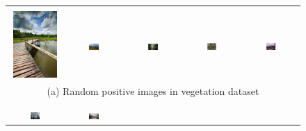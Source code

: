 \begin{figure}[th]
{{\begin{center}
\begin{tabular}{@{}c@{\,\,\,}c@{\,\,\,}c@{\,\,\,}c@{\,\,\,}c@{\,\,\,}}
\\[-6pt]
\hline
\\[-6pt]
\includegraphics[height=1in]{imggrid/datasetposi/6.jpg} &
\includegraphics[width=0.19\textwidth]{imggrid/datasetposi/7.jpg} &
\includegraphics[width=0.19\textwidth]{imggrid/datasetposi/8.jpg} &
\includegraphics[width=0.19\textwidth]{imggrid/datasetposi/9.jpg} &
\includegraphics[width=0.19\textwidth]{imggrid/datasetposi/10.jpg} \\
\multicolumn{5}{c}{(a) Random positive images in vegetation dataset} \\ 
\\[-6pt]
\hline
\\[-6pt]
\includegraphics[width=0.19\textwidth]{imggrid/datasetnega/1.jpg} &
\includegraphics[width=0.19\textwidth]{imggrid/datasetnega/2.jpg} &

\end{tabular}
\end{center}}}
\end{figure}
